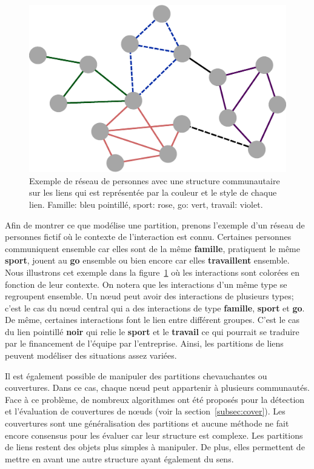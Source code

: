 \begin{figure}
\centering
\includegraphics[width=0.5\linewidth]{img/ExpectedNodes/Link_Partition}
\caption{Exemple de réseau de personnes avec une structure communautaire sur les liens qui est représentée par la couleur et le style de chaque lien. Famille: bleu pointillé, sport: rose, go: vert, travail: violet.}
\label{fig:linkpartition_exemple_expected}
\end{figure}
Afin de montrer ce que modélise une partition, prenons l'exemple d'un réseau de personnes fictif où le contexte de l'interaction est connu.
Certaines personnes communiquent ensemble car elles sont de la même \textbf{\textcolor{bleu_random}{famille}}, pratiquent le même \textbf{\textcolor{rose_cochon}{sport}}, jouent au \textbf{\textcolor{vert_fonce}{go}} ensemble ou bien encore car elles \textbf{\textcolor{violet_cool}{travaillent}} ensemble.
Nous illustrons cet exemple dans la figure~\ref{fig:linkpartition_exemple_expected} où les interactions sont colorées en fonction de leur contexte.
On notera que les interactions d'un même type se regroupent ensemble.
Un n\oe{}ud peut avoir des interactions de plusieurs types; c'est le cas du n\oe{}ud central qui a des interactions de type \textbf{\textcolor{bleu_random}{famille}}, \textbf{\textcolor{rose_cochon}{sport}} et \textbf{\textcolor{vert_fonce}{go}}.
De même, certaines interactions font le lien entre différent groupes.
C'est le cas du lien pointillé \textbf{noir} qui relie le \textbf{\textcolor{rose_cochon}{sport}} et le \textbf{\textcolor{violet_cool}{travail}} ce qui pourrait se traduire par le financement de l'équipe par l'entreprise.
Ainsi, les partitions de liens peuvent modéliser des situations assez variées.

Il est également possible de manipuler des partitions chevauchantes ou couvertures.
Dans ce cas, chaque n\oe{}ud peut appartenir à plusieurs communautés.
Face à ce problème, de nombreux algorithmes ont été proposés pour la détection et l'évaluation de couvertures de n\oe{}uds (voir la section~\ref{subsec:cover}).
Les couvertures sont une généralisation des partitions et aucune méthode ne fait encore consensus pour les évaluer car leur structure est complexe.
Les partitions de liens restent des objets plus simples à manipuler.
De plus, elles permettent de mettre en avant une autre structure ayant également du sens.



